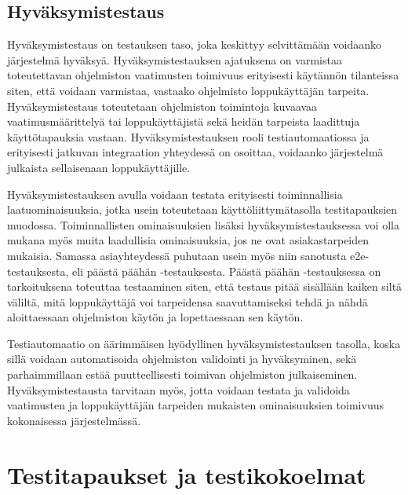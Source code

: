   \subsection{Hyväksymistestaus} \label{ch:07_hyvaksymistestaus}

    Hyväksymistestaus on testauksen taso, joka keskittyy selvittämään voidaanko järjestelmä hyväksyä.
    Hyväksymistestauksen ajatuksena on varmistaa toteutettavan ohjelmiston vaatimusten toimivuus erityisesti käytännön tilanteissa siten, että voidaan varmistaa, vastaako ohjelmisto loppukäyttäjän tarpeita.
    Hyväksymistestaus toteutetaan ohjelmiston toimintoja kuvaavaa vaatimusmäärittelyä tai loppukäyttäjistä sekä heidän tarpeista laadittuja käyttötapauksia vastaan.
    Hyväksymistestauksen rooli testiautomaatiossa ja erityisesti jatkuvan integraation yhteydessä on osoittaa, voidaanko järjestelmä julkaista sellaisenaan loppukäyttäjille. \cite{istqb_glossary_v3_3} \cite[s.~374]{software_testing_book}

    Hyväksymistestauksen avulla voidaan testata erityisesti toiminnallisia laatuominaisuuksia, jotka usein toteutetaan käyttöliittymätasolla testitapauksien muodossa.
    Toiminnallisten ominaisuuksien lisäksi hyväksymistestauksessa voi olla mukana myös muita laadullisia ominaisuuksia, jos ne ovat asiakastarpeiden mukaisia.
    Samassa asiayhteydessä puhutaan usein myös niin sanotusta e2e-testauksesta, eli päästä päähän -testauksesta.
    Päästä päähän -testauksessa on tarkoituksena toteuttaa testaaminen siten, että testaus pitää sisällään kaiken siltä väliltä, mitä loppukäyttäjä voi tarpeidensa saavuttamiseksi tehdä ja nähdä aloittaessaan ohjelmiston käytön ja lopettaessaan sen käytön.

    Testiautomaatio on äärimmäisen hyödyllinen hyväksymistestauksen tasolla, koska sillä voidaan automatisoida ohjelmiston validointi ja hyväksyminen, sekä parhaimmillaan estää puutteellisesti toimivan ohjelmiston julkaiseminen.
    Hyväksymistestausta tarvitaan myös, jotta voidaan testata ja validoida vaatimusten ja loppukäyttäjän tarpeiden mukaisten ominaisuuksien toimivuus kokonaisessa järjestelmässä.

\section{Testitapaukset ja testikokoelmat} \label{ch:07_testitapaukset_ja_testikokoelmat}

